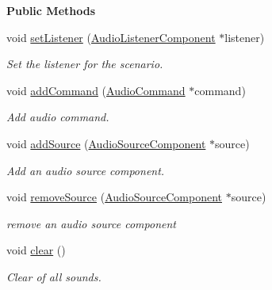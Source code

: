 \begin{Indent}\textbf{ Public Methods}\par
\begin{DoxyCompactItemize}
\item 
\mbox{\label{classrev_1_1_sound_manager_a4b3859fada6bfbe856a817a4cc58ea65}} 
void \mbox{\hyperlink{classrev_1_1_sound_manager_a4b3859fada6bfbe856a817a4cc58ea65}{set\+Listener}} (\mbox{\hyperlink{classrev_1_1_audio_listener_component}{Audio\+Listener\+Component}} $\ast$listener)
\begin{DoxyCompactList}\small\item\em Set the listener for the scenario. \end{DoxyCompactList}\item 
\mbox{\label{classrev_1_1_sound_manager_a255105f169d107c7d0e3bacab3799fe3}} 
void \mbox{\hyperlink{classrev_1_1_sound_manager_a255105f169d107c7d0e3bacab3799fe3}{add\+Command}} (\mbox{\hyperlink{classrev_1_1_audio_command}{Audio\+Command}} $\ast$command)
\begin{DoxyCompactList}\small\item\em Add audio command. \end{DoxyCompactList}\item 
\mbox{\label{classrev_1_1_sound_manager_a6527212f6322a3f26fb22793a64b004d}} 
void \mbox{\hyperlink{classrev_1_1_sound_manager_a6527212f6322a3f26fb22793a64b004d}{add\+Source}} (\mbox{\hyperlink{classrev_1_1_audio_source_component}{Audio\+Source\+Component}} $\ast$source)
\begin{DoxyCompactList}\small\item\em Add an audio source component. \end{DoxyCompactList}\item 
\mbox{\label{classrev_1_1_sound_manager_ae1642be1b39bea10fc861778c6bc26d5}} 
void \mbox{\hyperlink{classrev_1_1_sound_manager_ae1642be1b39bea10fc861778c6bc26d5}{remove\+Source}} (\mbox{\hyperlink{classrev_1_1_audio_source_component}{Audio\+Source\+Component}} $\ast$source)
\begin{DoxyCompactList}\small\item\em remove an audio source component \end{DoxyCompactList}\item 
\mbox{\label{classrev_1_1_sound_manager_a15a3ab87e22cdd0143aa659c412732b4}} 
void \mbox{\hyperlink{classrev_1_1_sound_manager_a15a3ab87e22cdd0143aa659c412732b4}{clear}} ()
\begin{DoxyCompactList}\small\item\em Clear of all sounds. \end{DoxyCompactList}\end{DoxyCompactItemize}
\end{Indent}
